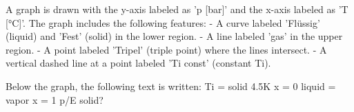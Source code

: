A graph is drawn with the y-axis labeled as 'p [bar]' and the x-axis labeled as 'T [°C]'. The graph includes the following features:  
- A curve labeled 'Flüssig' (liquid) and 'Fest' (solid) in the lower region.  
- A line labeled 'gas' in the upper region.  
- A point labeled 'Tripel' (triple point) where the lines intersect.  
- A vertical dashed line at a point labeled 'Ti const' (constant Ti).  

Below the graph, the following text is written:  
Ti = solid 4.5K  
x = 0 liquid = vapor  
x = 1 p/E solid?